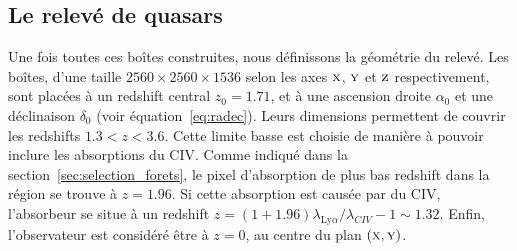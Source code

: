 \documentclass[11pt, twoside, a4paper, openright]{report}
\begin{document}
\subsection{Le relevé de quasars}
\label{subsec:qso}
Une fois toutes ces boîtes construites, nous définissons la géométrie du relevé. Les boîtes, d'une taille $\num{2560}\times\num{2560}\times\num{1536}$ selon les axes $\textsc{x}$, $\textsc{y}$ et $\textsc{z}$ respectivement, sont placées à un redshift central $z_0 = \num{1.71}$, et à une ascension droite $\alpha_0$ et une déclinaison $\delta_0$ (voir équation~\ref{eq:radec}). Leurs dimensions permettent de couvrir les redshifts $\num{1.3} < z < \num{3.6}$.
Cette limite basse est choisie de manière à pouvoir inclure les absorptions du CIV. Comme indiqué dans la section~\ref{sec:selection_forets}, le pixel d'absorption de plus bas redshift dans la région \lya{}  se trouve à $z = \num{1.96}$. Si cette absorption est causée par du CIV, l'absorbeur se situe à un redshift $z = (1+\num{1.96}) \lambda_{\mathrm{Ly}\alpha} / \lambda_{CIV} - 1 \sim \num{1.32}$.
Enfin, l'observateur est considéré être à $z=0$, au centre du plan $(\textsc{x},\textsc{y})$.
\end{document}
